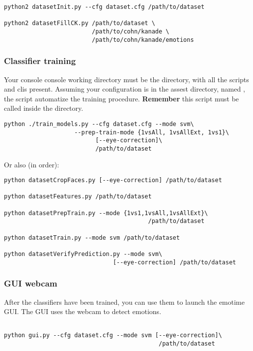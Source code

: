 \begin{verbatim}
python2 datasetInit.py --cfg dataset.cfg /path/to/dataset

python2 datasetFillCK.py /path/to/dataset \
                         /path/to/cohn/kanade \
                         /path/to/cohn/kanade/emotions
\end{verbatim}

\subsubsection*{Classifier training}

Your console console working directory must be the  directory,
with all the scripts and clis present. Assuming your configuration is in the
assest directory, named \code{dataset.cfg}, the script 
automatize the training procedure. \textbf{Remember} this script must be called
inside the \code{assest} directory.

\begin{verbatim}
python ./train_models.py --cfg dataset.cfg --mode svm\
                    --prep-train-mode {1vsAll, 1vsAllExt, 1vs1}\
                          [--eye-correction]\
                          /path/to/dataset
\end{verbatim}

Or also (in order):

\begin{verbatim}
python datasetCropFaces.py [--eye-correction] /path/to/dataset

python datasetFeatures.py /path/to/dataset

python datasetPrepTrain.py --mode {1vs1,1vsAll,1vsAllExt}\
                                         /path/to/dataset

python datasetTrain.py --mode svm /path/to/dataset

python datasetVerifyPrediction.py --mode svm\
                               [--eye-correction] /path/to/dataset
\end{verbatim}

\subsubsection*{GUI webcam}

After the classifiers have been trained, you can use them to launch the emotime
GUI\@. The GUI uses the webcam to  detect emotions.

\begin{verbatim}

python gui.py --cfg dataset.cfg --mode svm [--eye-correction]\
                                            /path/to/dataset
\end{verbatim}
